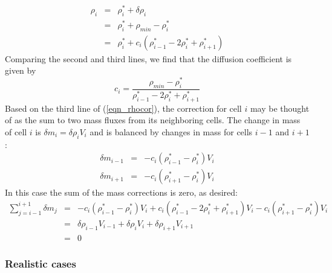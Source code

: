\documentclass[11pt]{book}
\begin{document}
\begin{eqnarray}
\label{eqn_rhocor}
\rho_i &=& \rho_i^* + \delta \rho_i \nonumber\\
&=& \rho_i^* + \rho_{min} - \rho_i^* \nonumber\\
&=&  \rho_i^* + c_i (\rho_{i-1}^* - 2 \rho_i^* + \rho_{i+1}^*)
\end{eqnarray}
Comparing the second and third lines, we find that the diffusion coefficient is given by
\begin{equation}
\label{eqn_diffcoef}
c_i = \frac{\rho_{min} - \rho_i^*}{\rho_{i-1}^* - 2 \rho_i^* + \rho_{i+1}^*} 
\end{equation}
Based on the third line of (\ref{eqn_rhocor}), the correction for cell $i$ may be thought of as the sum to two mass fluxes from its neighboring cells.  The change in mass of cell $i$ is $\delta m_i = \delta \rho_i V_i$ and is balanced by changes in mass for cells $i-1$ and $i+1$:
\begin{eqnarray}
\delta m_{i-1} &=& - c_i (\rho_{i-1}^* - \rho_i^*) V_i \nonumber\\
\delta m_{i+1} &=& - c_i (\rho_{i+1}^* - \rho_i^*) V_i \nonumber
\end{eqnarray}
In this case the sum of the mass corrections is zero, as desired:
\begin{eqnarray}
\sum_{j=i-1}^{i+1} \delta m_j &=& - c_i (\rho_{i-1}^* - \rho_i^*) V_i + c_i (\rho_{i-1}^* - 2 \rho_i^* + \rho_{i+1}^*) V_i - c_i (\rho_{i+1}^* - \rho_i^*) V_i \nonumber\\
&=& \delta \rho_{i-1} V_{i-1} + \delta \rho_i V_i + \delta \rho_{i+1}V_{i+1} \nonumber\\
&=& 0 \nonumber
\end{eqnarray}

\subsubsection{Realistic cases}
\end{document}
